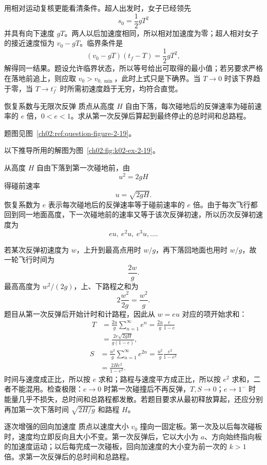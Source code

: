 {\begin{xesolution}
用相对运动复核更能看清条件。超人出发时，女子已经领先
\[
s_0=\frac12gT^2
\]
并具有向下速度 $gT$。两人以后加速度相同，所以相对加速度为零；超人相对女子的接近速度恒为 $v_0-gT$。临界条件是
\[
(v_0-gT)(t_f-T)=\frac12gT^2,
\]
解得同一结果。题设允许临界状态，所以等号给出可取得的最小值；若另要求严格在落地前追上，则应取 $v_0>v_{0,\min}$，此时上式只是下确界。当 $T\to0$ 时该下界趋于零，当 $T\to t_f^-$ 时所需初速度趋于无穷，均符合直觉。
\end{xesolution}

\begin{origexamplebox}{恢复系数与无限次反弹}\label{ch02:ex:k02-2-19}
质点从高度 $H$ 自由下落，每次碰地后的反弹速率为碰前速率的 $e$ 倍，$0<e<1$。求从第一次反弹后算起到最终停止的总时间和总路程。
\par 题图见图~\ref{ch02:ref:question-figure-2-19}。
\KQuestionAT
\end{origexamplebox}
\begin{xesolution}
以下推导所用的解图为图~\ref{ch02:fig:k02-ex-2-19}。

从高度 $H$ 自由下落到第一次碰地前，由
\[
u^2=2gH
\]
得碰前速率
\[
u=\sqrt{2gH}.
\]
恢复系数为 $e$ 表示每次碰地后的反弹速率等于碰前速率的 $e$ 倍。由于每次飞行都回到同一地面高度，下一次碰地前的速率又等于该次反弹初速，所以历次反弹初速度为
\[
eu,\ e^2u,\ e^3u,\ldots.
\]

若某次反弹初速度为 $w$，上升到最高点用时 $w/g$，再下落回地面也用时 $w/g$，故一轮飞行时间为
\[
\frac{2w}{g}.
\]
最高高度为 $w^2/(2g)$，上、下路程之和为
\[
2\frac{w^2}{2g}=\frac{w^2}{g}.
\]
题目从第一次反弹后开始计时和计路程，因此从 $w=eu$ 对应的项开始求和：
\BounceDiagram
\[
\begin{aligned}
T&=\frac{2u}{g}\sum_{n=1}^{\infty}e^n
=\frac{2u}{g}\frac{e}{1-e}\\
&=\boxed{\frac{2e\sqrt{2gH}}{g(1-e)}},
\end{aligned}
\]
\[
\begin{aligned}
S&=\frac{u^2}{g}\sum_{n=1}^{\infty}e^{2n}
=\frac{u^2}{g}\frac{e^2}{1-e^2}\\
&=\boxed{\frac{2He^2}{1-e^2}}.
\end{aligned}
\]
时间与速度成正比，所以按 $e$ 求和；路程与速度平方成正比，所以按 $e^2$ 求和，二者不能混用。检查极限：$e\to0$ 时第一次碰撞后不再反弹，$T,S\to0$；$e\to1^-$ 时能量几乎不损失，总时间和总路程都发散。若题目要求从最初释放算起，还应分别再加第一次下落时间 $\sqrt{2H/g}$ 和路程 $H$。
\end{xesolution}

\begin{origexamplebox}{逐次增强的回向加速度}\label{ch02:ex:k02-2-20}
质点以速度大小 $v_0$ 撞向一固定板。第一次及以后每次碰板时，速度均立即反向且大小不变。第一次反弹后，它以大小为 $a$、方向始终指向板的加速度运动；以后每完成一次碰板，回向加速度的大小变为前一次的 $k>1$ 倍。求第一次反弹后的总时间和总路程。


\end{origexamplebox}}
